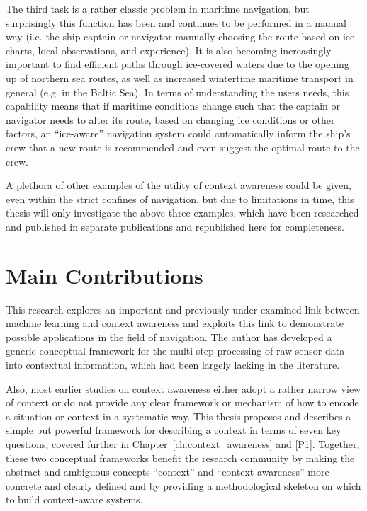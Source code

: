 The third task is a rather classic problem in maritime navigation, but surprisingly this function has been and continues to be performed in a manual way (i.e. the ship captain or navigator manually choosing the route based on ice charts, local observations, and experience). It is also becoming increasingly important to find efficient paths through ice-covered waters due to the opening up of northern sea routes, as well as increased wintertime maritime transport in general (e.g. in the Baltic Sea). In terms of understanding the users needs, this capability means that if maritime conditions change such that the captain or navigator needs to alter its route, based on changing ice conditions or other factors, an ``ice-aware'' navigation system could automatically inform the ship's crew that a new route is recommended and even suggest the optimal route to the crew.

A plethora of other examples of the utility of context awareness could be given, even within the strict confines of navigation, but due to limitations in time, this thesis will only investigate the above three examples, which have been researched and published in separate publications and republished here for completeness.

\section{Main Contributions}
\label{sec:contributions}

This research explores an important and previously under-examined link between machine learning and context awareness and exploits this link to demonstrate possible applications in the field of navigation. The author has developed a generic conceptual framework for the multi-step processing of raw sensor data into contextual information, which had been largely lacking in the literature. 

Also, most earlier studies on context awareness either adopt a rather narrow view of context or do not provide any clear framework or mechanism of how to encode a situation or context in a systematic way. This thesis proposes and describes a simple but powerful framework for describing a context in terms of seven key questions, covered further in Chapter~\ref{ch:context_awareness} and [P1]. Together, these two conceptual frameworks benefit the research community by making the abstract and ambiguous concepts ``context'' and ``context awareness'' more concrete and clearly defined and by providing a methodological skeleton on which to build context-aware systems.

